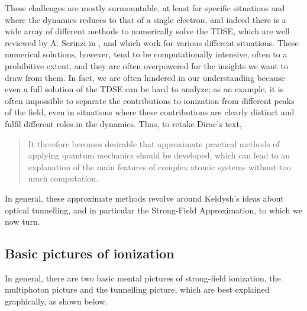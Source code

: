 These challenges are mostly surmountable, at least for specific situations and where the dynamics reduces to that of a single electron, and indeed there is a wide array of different methods to numerically solve the TDSE, which are well reviewed by A. Scrinzi in , and which work for various different situations. These numerical solutions, however, tend to be computationally intensive, often to a prohibitive extent, and they are often overpowered for the insights we want to draw from them. In fact, we are often hindered in our understanding because even a full solution of the TDSE can be hard to analyze; as an example, it is often impossible to separate the contributions to ionization from different peaks of the field, even in situations where these contributions are clearly distinct and fulfil different roles in the dynamics. Thus, to retake Dirac's text,
%
\begin{quote}
It therefore becomes desirable that approximate practical methods of applying quantum mechanics should be developed, which can lead to an explanation of the main features of complex atomic systems without too much computation.
\end{quote}
%
In general, these approximate methods revolve around Keldysh's ideas about optical tunnelling, and in particular the Strong-Field Approximation, to which we now turn.



\subsection{Basic pictures of ionization}
In general, there are two basic mental pictures of strong-field ionization, the multiphoton picture and the tunnelling picture, which are best explained graphically, as shown below.


